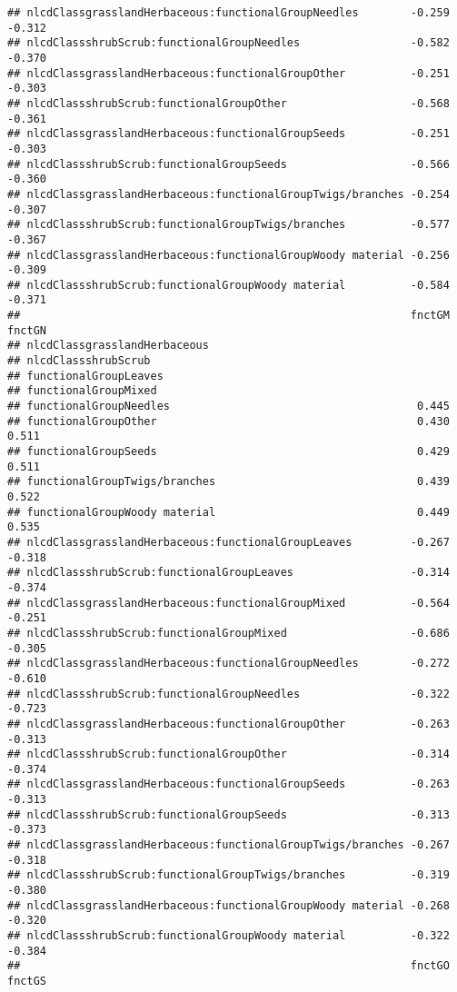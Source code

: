 \documentclass[]{article}
\begin{document}
\begin{verbatim}
## nlcdClassgrasslandHerbaceous:functionalGroupNeedles        -0.259 -0.312
## nlcdClassshrubScrub:functionalGroupNeedles                 -0.582 -0.370
## nlcdClassgrasslandHerbaceous:functionalGroupOther          -0.251 -0.303
## nlcdClassshrubScrub:functionalGroupOther                   -0.568 -0.361
## nlcdClassgrasslandHerbaceous:functionalGroupSeeds          -0.251 -0.303
## nlcdClassshrubScrub:functionalGroupSeeds                   -0.566 -0.360
## nlcdClassgrasslandHerbaceous:functionalGroupTwigs/branches -0.254 -0.307
## nlcdClassshrubScrub:functionalGroupTwigs/branches          -0.577 -0.367
## nlcdClassgrasslandHerbaceous:functionalGroupWoody material -0.256 -0.309
## nlcdClassshrubScrub:functionalGroupWoody material          -0.584 -0.371
##                                                            fnctGM fnctGN
## nlcdClassgrasslandHerbaceous                                            
## nlcdClassshrubScrub                                                     
## functionalGroupLeaves                                                   
## functionalGroupMixed                                                    
## functionalGroupNeedles                                      0.445       
## functionalGroupOther                                        0.430  0.511
## functionalGroupSeeds                                        0.429  0.511
## functionalGroupTwigs/branches                               0.439  0.522
## functionalGroupWoody material                               0.449  0.535
## nlcdClassgrasslandHerbaceous:functionalGroupLeaves         -0.267 -0.318
## nlcdClassshrubScrub:functionalGroupLeaves                  -0.314 -0.374
## nlcdClassgrasslandHerbaceous:functionalGroupMixed          -0.564 -0.251
## nlcdClassshrubScrub:functionalGroupMixed                   -0.686 -0.305
## nlcdClassgrasslandHerbaceous:functionalGroupNeedles        -0.272 -0.610
## nlcdClassshrubScrub:functionalGroupNeedles                 -0.322 -0.723
## nlcdClassgrasslandHerbaceous:functionalGroupOther          -0.263 -0.313
## nlcdClassshrubScrub:functionalGroupOther                   -0.314 -0.374
## nlcdClassgrasslandHerbaceous:functionalGroupSeeds          -0.263 -0.313
## nlcdClassshrubScrub:functionalGroupSeeds                   -0.313 -0.373
## nlcdClassgrasslandHerbaceous:functionalGroupTwigs/branches -0.267 -0.318
## nlcdClassshrubScrub:functionalGroupTwigs/branches          -0.319 -0.380
## nlcdClassgrasslandHerbaceous:functionalGroupWoody material -0.268 -0.320
## nlcdClassshrubScrub:functionalGroupWoody material          -0.322 -0.384
##                                                            fnctGO fnctGS

\end{verbatim}
\end{document}
